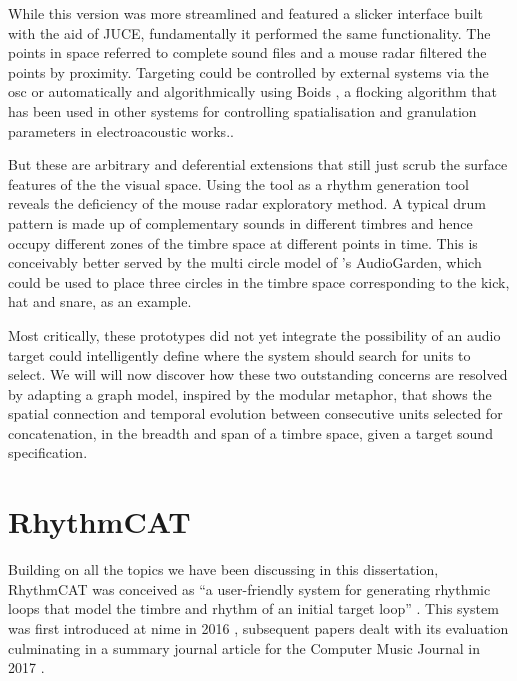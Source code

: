 While this version was more streamlined and featured a slicker interface built with the aid of JUCE, fundamentally it performed the same functionality. The points in space referred to complete sound files and a mouse radar filtered the points by proximity. Targeting could be controlled by external systems via the \acrshort{osc} or automatically and algorithmically using Boids \citep{Reynolds1987}, a flocking algorithm that has been used in other systems for controlling spatialisation and granulation parameters in electroacoustic works.\citep{Kim-Boyle2006, Wilson2008, Barreiro2010}. 

But these are arbitrary and deferential extensions that still just scrub the surface features of the the visual space. Using the tool as a rhythm generation tool reveals the deficiency of the mouse radar exploratory method. A typical drum pattern is made up of complementary sounds in different timbres and hence occupy different zones of the timbre space at different points in time. This is conceivably better served by the multi circle model of \citep{Frisson2010}'s AudioGarden, which could be used to place three circles in the timbre space corresponding to the kick, hat and snare, as an example.

Most critically, these prototypes did not yet integrate the possibility of an audio target could  intelligently define where the system should search for units to select. We will will now discover how these two outstanding concerns are resolved by adapting a graph model, inspired by the modular metaphor, that shows the spatial connection and temporal evolution between consecutive units selected for concatenation, in the breadth and span of a timbre space, given a target sound specification.

\section{RhythmCAT}

Building on all the topics we have been discussing in this dissertation, RhythmCAT was conceived as ``a user-friendly system for generating rhythmic loops that model the timbre and rhythm of an initial target loop'' \citep{Nuanain2017b}. This system was first introduced at \acrfull{nime} in 2016 \citep{Nuanain2016a}, subsequent papers dealt with its evaluation \citep{Nuanain2016b, Nuanain2016c} culminating in a summary journal article for the Computer Music Journal in 2017 \citep{Nuanain2017b}.

%
%
%

